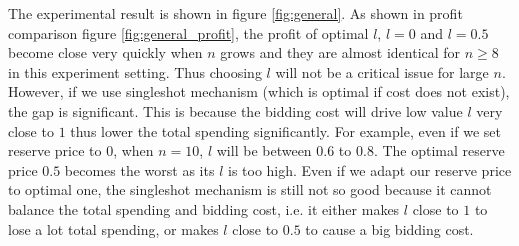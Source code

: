 The experimental result is shown in figure \ref{fig:general}. As shown in
profit comparison figure \ref{fig:general_profit}, the profit of optimal $l$,
$l = 0$ and $l = 0.5$ become close very quickly when $n$ grows and they are
almost identical for $n \geq 8$ in this experiment setting. Thus choosing $l$
will not be a critical issue for large $n$. However, if we use singleshot
mechanism (which is optimal if cost does not exist), the gap is significant.
This is because the bidding cost will drive low value $l$ very
close to $1$ thus lower the total spending significantly. For example, even if
we set reserve price to $0$, when $n = 10$, $l$ will be between $0.6$ to $0.8$.
The optimal reserve price $0.5$ becomes the worst as its $l$ is too high. 
Even if we adapt our reserve price to optimal one, the singleshot mechanism is
still not so good because it cannot balance the total spending and bidding cost,
i.e. it either makes $l$ close to $1$ to lose a lot total spending, or makes
$l$ close to $0.5$ to cause a big bidding cost.
